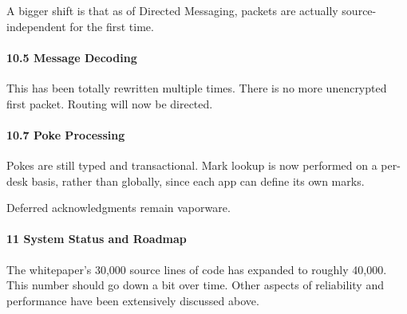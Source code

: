 \documentclass[twoside]{article}
\begin{document}
A bigger shift is that as of Directed Messaging, packets are actually source-independent for the first time.

\paragraph{10.5 Message Decoding}  This has been totally rewritten multiple times.  There is no more unencrypted first packet.  Routing will now be directed.

\paragraph{10.7 Poke Processing}  Pokes are still typed and transactional.  Mark lookup is now performed on a per-desk basis, rather than globally, since each app can define its own marks.

Deferred acknowledgments remain vaporware.

\paragraph{11 System Status and Roadmap}  The whitepaper's 30,000 source lines of code has expanded to roughly 40,000.  This number should go down a bit over time.  Other aspects of reliability and performance have been extensively discussed above.

\printbibliography
\end{document}
